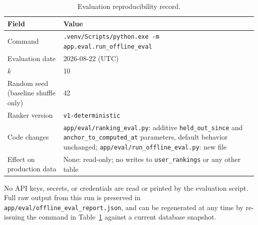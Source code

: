 \begin{table}[htbp]
\centering
\caption{Evaluation reproducibility record.}
\label{tab:reproducibility}
\begin{tabular}{|p{4.3cm}|p{9.2cm}|}
\hline
\textbf{Field} & \textbf{Value} \\
\hline
Command & \texttt{.venv/Scripts/python.exe -m app.eval.run\_offline\_eval} \\
\hline
Evaluation date & 2026-08-22 (UTC) \\
\hline
$k$ & 10 \\
\hline
Random seed (baseline shuffle only) & 42 \\
\hline
Ranker version & \texttt{v1-deterministic} \\
\hline
Code changes & \texttt{app/eval/ranking\_eval.py}: additive \texttt{held\_out\_since} and \texttt{anchor\_to\_computed\_at} parameters, default behavior unchanged; \texttt{app/eval/run\_offline\_eval.py}: new file \\
\hline
Effect on production data & None: read-only; no writes to \texttt{user\_rankings} or any other table \\
\hline
\end{tabular}
\end{table}

No API keys, secrets, or credentials are read or printed by the evaluation script. Full raw output from this run is preserved in \texttt{app/eval/offline\_eval\_report.json}, and can be regenerated at any time by re-issuing the command in Table~\ref{tab:reproducibility} against a current database snapshot.
